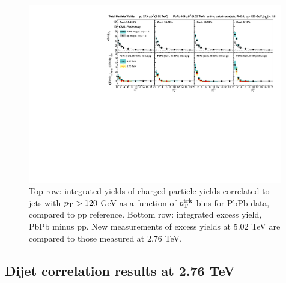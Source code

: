  
  \begin{figure}[hbt]
    \begin{center}
       \includegraphics[width=0.99\textwidth]{figures/results/Integral_dR.pdf}
         \caption[Integrated inclusive jet charged particle yields at 2.76 and 5.02 TeV]{Top row: integrated yields of charged particle yields correlated to jets with $p_{\rm T} > 120$ GeV as a function of $p_{\rm T}^{\rm trk}$ bins for PbPb data, compared to pp reference.  Bottom row:  integrated excess yield, PbPb minus pp. New measurements of excess yields at 5.02 TeV are compared to those measured at 2.76 TeV.}       \label{fig:yield_integral}
    \end{center}
 \end{figure}


\clearpage

\subsection{Dijet correlation results at 2.76 TeV}
\label{sec:dijet_corr}

